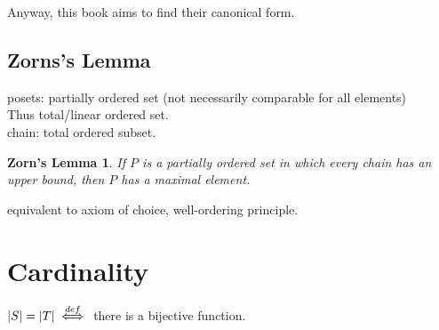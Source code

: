 \documentclass[../main.tex]{subfiles}
\begin{document}
Anyway, this book aims to find their canonical form.
\subsection*{Zorns's Lemma}
posets: partially ordered set (not necessarily comparable for all elements) \\
Thus total/linear ordered set. \\
chain: total ordered subset.

\newtheorem*{zorn}{Zorn's Lemma}
\begin{zorn}
    If $P$ is a partially ordered set in which every chain has an upper bound, then $P$ has 
    a maximal element.
\end{zorn}
equivalent to axiom of choice, well-ordering principle.

\section*{Cardinality}
$|S| = |T| \overset{def}{\iff}$ there is a bijective function.
\end{document}
